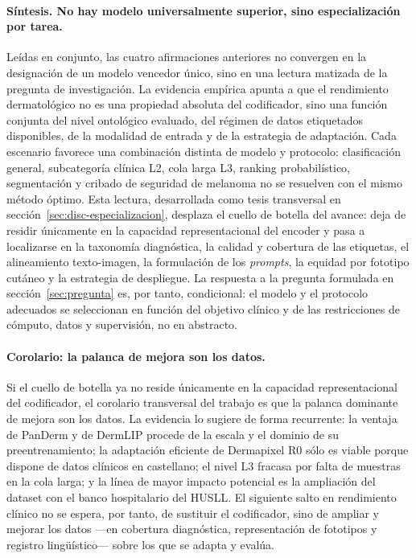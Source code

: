 \paragraph{Síntesis. No hay modelo universalmente superior, sino
especialización por tarea.}
Leídas en conjunto, las cuatro afirmaciones anteriores no convergen
en la designación de un modelo vencedor único, sino en una lectura
matizada de la pregunta de investigación. La evidencia empírica
apunta a que el rendimiento dermatológico no es una propiedad
absoluta del codificador, sino una función conjunta del nivel
ontológico evaluado, del régimen de datos etiquetados disponibles,
de la modalidad de entrada y de la estrategia de adaptación. Cada
escenario favorece una combinación distinta de modelo y protocolo:
clasificación general, subcategoría clínica L2, cola larga L3,
ranking probabilístico, segmentación y cribado de seguridad de
melanoma no se resuelven con el mismo método óptimo. Esta lectura,
desarrollada como tesis transversal en
sección~\ref{sec:disc-especializacion}, desplaza el cuello de
botella del avance: deja de residir únicamente en la capacidad
representacional del encoder y pasa a localizarse en la taxonomía
diagnóstica, la calidad y cobertura de las etiquetas, el
alineamiento texto-imagen, la formulación de los \emph{prompts}, la
equidad por fototipo cutáneo y la estrategia de despliegue. La
respuesta a la pregunta formulada en sección~\ref{sec:pregunta} es,
por tanto, condicional: el modelo y el protocolo adecuados se
seleccionan en función del objetivo clínico y de las restricciones
de cómputo, datos y supervisión, no en abstracto.

\paragraph{Corolario: la palanca de mejora son los datos.}
Si el cuello de botella ya no reside únicamente en la capacidad
representacional del codificador, el corolario transversal del trabajo
es que la palanca dominante de mejora son los datos. La evidencia lo
sugiere de forma recurrente: la ventaja de PanDerm y de DermLIP
procede de la escala y el dominio de su preentrenamiento; la
adaptación eficiente de Dermapixel R0 sólo es viable porque dispone de
datos clínicos en castellano; el nivel L3 fracasa por falta de
muestras en la cola larga; y la línea de mayor impacto potencial es la
ampliación del dataset con el banco hospitalario del HUSLL. El
siguiente salto en rendimiento clínico no se espera, por tanto, de
sustituir el codificador, sino de ampliar y mejorar los datos ---en
cobertura diagnóstica, representación de fototipos y registro
lingüístico--- sobre los que se adapta y evalúa.

